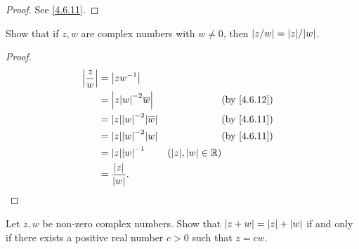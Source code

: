 \begin{proof}
  See \cref{4.6.11}.
\end{proof}

\begin{ex}\label{ex:4.6.7}
  Show that if \(z, w\) are complex numbers with \(w \neq 0\), then \(\abs{z / w} = \abs{z} / \abs{w}\).
\end{ex}

\begin{proof}
  \begin{align*}
    \abs{\dfrac{z}{w}} & = \abs{z w^{-1}}                                                                                  \\
                       & = \abs{z \abs{w}^{-2} \overline{w}}       &                           & \text{(by \cref{4.6.12})} \\
                       & = \abs{z} \abs{w}^{-2} \abs{\overline{w}} &                           & \text{(by \cref{4.6.11})} \\
                       & = \abs{z} \abs{w}^{-2} \abs{w}            &                           & \text{(by \cref{4.6.11})} \\
                       & = \abs{z} \abs{w}^{-1}                    & (\abs{z}, \abs{w} \in \R)                             \\
                       & = \dfrac{\abs{z}}{\abs{w}}.
  \end{align*}
\end{proof}

\begin{ex}\label{ex:4.6.8}
  Let \(z, w\) be non-zero complex numbers.
  Show that \(\left\lvert z + w\right\rvert = \left\lvert z\right\rvert + \left\lvert w\right\rvert\) if and only if there exists a positive real number \(c > 0\) such that \(z = cw\).
\end{ex}

